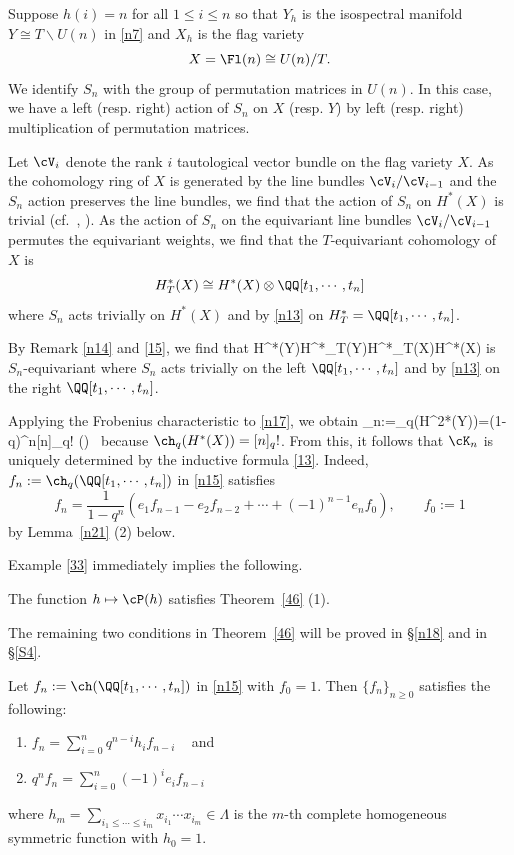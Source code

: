 \begin{example}\label{33}
	Suppose $h(i)=n$ for all $1\leq i \leq n$ so that $Y_h$ is the isospectral manifold $Y\cong T\backslash U(n)$ in \eqref{n7} and $X_h$ is the flag variety $$X=\Fl(n)\cong U(n)/T.$$
	We identify $S_n$ with the group of permutation matrices in $U(n)$. 
	In this case, we have a left (resp. right) action of $S_n$ on $X$ (resp. $Y$) by left (resp. right) multiplication of permutation matrices. 
	
	Let $\cV_i$ denote the rank $i$ tautological vector bundle on the flag variety $X$. As the cohomology ring of $X$ is generated by the line bundles $\cV_i/\cV_{i-1}$ and the $S_n$ action preserves the line bundles, we find that the action of $S_n$ on $H^*(X)$ is trivial (cf.~\cite[Proposition 4.2]{Tym}, \cite[Example 2.12]{KL}). 
	As the action of $S_n$ on the equivariant line bundles $\cV_i/\cV_{i-1}$ permutes the equivariant weights, we find that the $T$-equivariant cohomology of $X$ is 
	$$H^*_T(X)\cong H^*(X)\otimes \QQ[t_1,\cdots,t_n]$$
	where $S_n$ acts trivially on $H^*(X)$ and by \eqref{n13} on $H^*_T=\QQ[t_1,\cdots,t_n]$.
	
	By Remark \ref{n14} and \eqref{15}, we find that 
	\beq\label{n17}
	H^*(Y)\otimes \QQ[t_1,\cdots,t_n]\cong H^*_T(Y)\cong H^*_T(X)\cong H^*(X)\otimes \QQ[t_1,\cdots,t_n] \eeq
	is $S_n$-equivariant where $S_n$ acts trivially on the left $\QQ[t_1,\cdots,t_n]$ and by \eqref{n13} on the right $\QQ[t_1,\cdots,t_n]$. 
	
	Applying the Frobenius characteristic to \eqref{n17}, we obtain 
	\beq\label{n15}
	\cK_n:=\ch_q(H^{2*}(Y))=(1-q)^n[n]_q! \ch (\QQ[t_1,\cdots,t_n])~\in \Lambda[q]\eeq
	because 
	$\ch_q(H^*(X))=[n]_q!$.
	From this, it follows that $\cK_n$ is uniquely determined by the inductive formula \eqref{13}. 
	Indeed, $f_n:=\ch_q (\QQ[t_1,\cdots,t_n])$ in \eqref{n15} satisfies 
		\[f_n=\frac{1}{1-q^n}\left(e_{1}f_{n-1}-e_2f_{n-2}+\cdots +(-1)^{n-1}e_nf_0\right), \qquad f_0:=1\]
	by Lemma~\ref{n21} (2) below. 
		\end{example}
		
Example \ref{33} immediately implies the following.
\begin{proposition}\label{n16}
The function $h\mapsto \cP(h)$ satisfies  Theorem~\ref{46} (1). 
\end{proposition}


The remaining two conditions in Theorem~\ref{46} will be proved in \S\ref{n18} and in \S\ref{S4}.  

\begin{lemma}\label{n21}
	Let $f_n:=\ch(\QQ[t_1,\cdots,t_n])$ in \eqref{n15} with $f_0=1$. Then $\{f_n\}_{n\geq 0}$ satisfies the following: 
	\begin{enumerate}
		\item $ f_n=\sum_{i=0}^n q^{n-i}h_if_{n-i}$ ~ and 
		\item $q^nf_n=\sum_{i=0}^n(-1)^ie_if_{n-i}$
	\end{enumerate}
	where 
	$h_m=\sum_{i_1\leq \cdots \leq i_m}x_{i_1}\cdots x_{i_m} \in \Lambda$ is the $m$-th complete homogeneous symmetric function with $h_0=1$. 
\end{lemma}	


